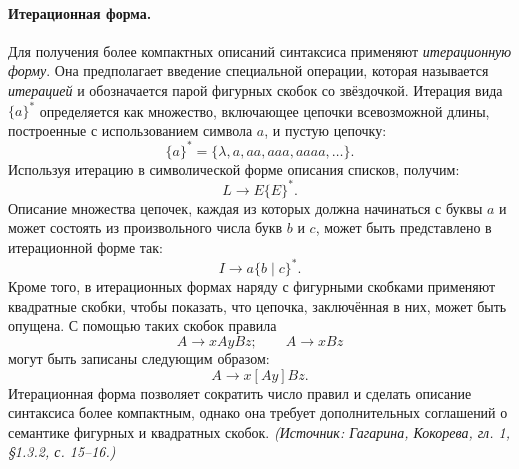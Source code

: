 \documentclass[a4paper,12pt]{article}
\begin{document}
\paragraph{Итерационная форма.}
Для получения более компактных описаний синтаксиса применяют \emph{итерационную форму}. Она предполагает введение специальной операции, которая называется \emph{итерацией} и обозначается парой фигурных скобок со звёздочкой. Итерация вида \(\{a\}^*\) определяется как множество, включающее цепочки всевозможной длины, построенные с использованием символа \(a\), и пустую цепочку:
\[
\{a\}^*=\{\lambda,a,aa,aaa,aaaa,\ldots\}.
\]
Используя итерацию в символической форме описания списков, получим:
\[
L\to E\{E\}^*.
\]
Описание множества цепочек, каждая из которых должна начинаться с буквы \(a\) и может состоять из произвольного числа букв \(b\) и \(c\), может быть представлено в итерационной форме так:
\[
I\to a\{b\mid c\}^*.
\]
Кроме того, в итерационных формах наряду с фигурными скобками применяют квадратные скобки, чтобы показать, что цепочка, заключённая в них, может быть опущена. С помощью таких скобок правила
\[
A\to xAyBz;\qquad A\to xBz
\]
могут быть записаны следующим образом:
\[
A\to x[Ay]Bz.
\]
Итерационная форма позволяет сократить число правил и сделать описание синтаксиса более компактным, однако она требует дополнительных соглашений о семантике фигурных и квадратных скобок.
\textit{(Источник: Гагарина, Кокорева, гл. 1, §1.3.2, с. 15--16.)}
\end{document}
